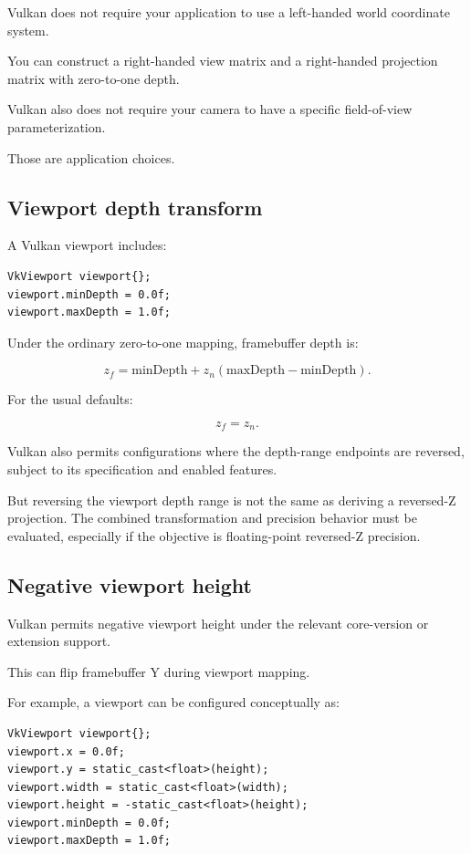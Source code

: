Vulkan does not require your application to use a left-handed world coordinate system.

You can construct a right-handed view matrix and a right-handed projection matrix with zero-to-one depth.

Vulkan also does not require your camera to have a specific field-of-view parameterization.

Those are application choices.

\subsection{Viewport depth transform}\label{02-foundations-ii-ch033-viewport-depth-transform}

A Vulkan viewport includes:

\begin{verbatim}
VkViewport viewport{};
viewport.minDepth = 0.0f;
viewport.maxDepth = 1.0f;
\end{verbatim}

Under the ordinary zero-to-one mapping, framebuffer depth is:

\[
 \boxed{ z_f= \text{minDepth} + z_n(\text{maxDepth}-\text{minDepth}) }.
\]

For the usual defaults:

\[
 z_f=z_n.
\]

Vulkan also permits configurations where the depth-range endpoints are reversed, subject to its specification and enabled features.

But reversing the viewport depth range is not the same as deriving a reversed-Z projection. The combined transformation and precision behavior must be evaluated, especially if the objective is floating-point reversed-Z precision.

\subsection{Negative viewport height}\label{02-foundations-ii-ch033-negative-viewport-height}

Vulkan permits negative viewport height under the relevant core-version or extension support.

This can flip framebuffer Y during viewport mapping.

For example, a viewport can be configured conceptually as:

\begin{verbatim}
VkViewport viewport{};
viewport.x = 0.0f;
viewport.y = static_cast<float>(height);
viewport.width = static_cast<float>(width);
viewport.height = -static_cast<float>(height);
viewport.minDepth = 0.0f;
viewport.maxDepth = 1.0f;
\end{verbatim}

